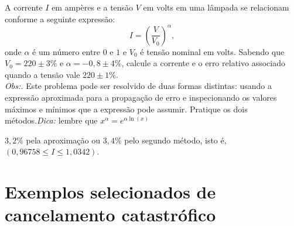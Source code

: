 \begin{exer} A corrente $I$ em ampères e a tensão $V$ em volts em uma lâmpada se relacionam conforme a seguinte expressão:
  \begin{equation*}
    I=\left(\frac{V}{V_0}\right)^\alpha,
  \end{equation*}
onde $\alpha$ é um número entre $0$ e $1$ e $V_0$ é tensão nominal em volts. Sabendo que $V_0=220\pm 3\%$ e $\alpha=-0,8\pm 4\%$, calcule a corrente e o erro relativo associado quando a tensão vale $220\pm 1\%$.\\
\emph{Obs:.} Este problema pode ser resolvido de duas formas distintas: usando a expressão aproximada para a propagação de erro e inspecionando os valores máximos e mínimos que a expressão pode assumir. Pratique os dois métodos.\emph{Dica:} lembre que $x^\alpha=e^{\alpha \ln(x)}$
\end{exer}
\begin{resp}
  $3,2\%$ pela aproximação ou $3,4\%$ pelo segundo método, isto é, $\left(0,96758 \leq I\leq 1,0342\right)$.
\end{resp}




\section{Exemplos selecionados de cancelamento catastrófico}

